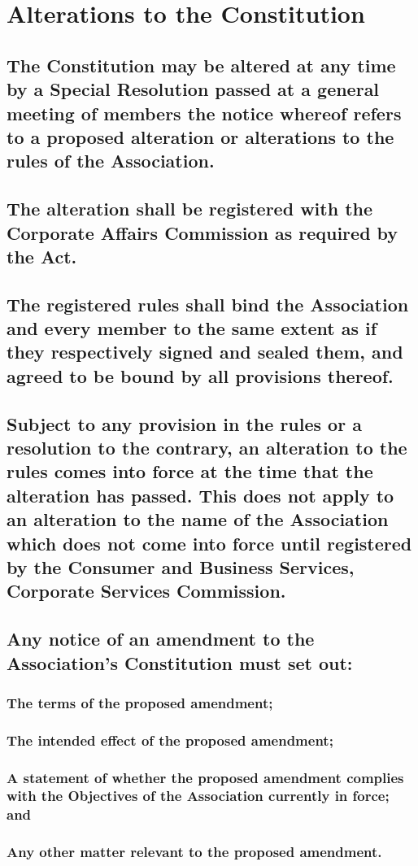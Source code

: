 \documentclass{article}
\newenvironment{subs}
  {\adjustwidth{2em}{0pt}}
  {\endadjustwidth}
\begin{document}
\section{Alterations to the Constitution}
\begin{subs}
\subsection{The Constitution may be altered at any time by a Special Resolution passed at a general meeting of members the notice whereof refers to a proposed alteration or alterations to the rules of the Association.}
\subsection{The alteration shall be registered with the Corporate Affairs Commission as required by the Act.}
\subsection{The registered rules shall bind the Association and every member to the same extent as if they respectively signed and sealed them, and agreed to be bound by all provisions thereof.}
\subsection{Subject to any provision in the rules or a resolution to the contrary, an alteration to the rules comes into force at the time that the alteration has passed. This does not apply to an alteration to the name of the Association which does not come into force until registered by the Consumer and Business Services, Corporate Services Commission.}

\subsection{Any notice of an amendment to the Association's Constitution must set out:}
\begin{subs}
\subsubsection{The terms of the proposed amendment;}
\subsubsection{The intended effect of the proposed amendment;}
\subsubsection{A statement of whether the proposed amendment complies with the Objectives of the Association currently in force; and}
\subsubsection{Any other matter relevant to the proposed amendment.}
\end{subs}
\end{subs}
\end{document}
